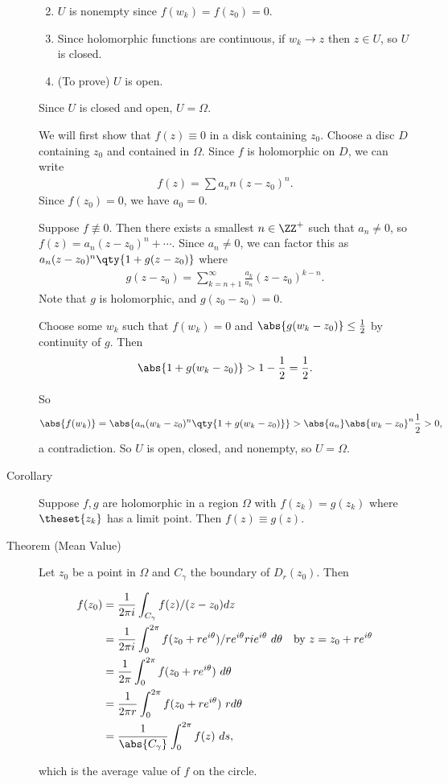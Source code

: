 \begin{description}
\begin{enumerate}
\def\labelenumi{\arabic{enumi}.}
\tightlist
\item
  \(U\) is nonempty since \(f(w_k) = f(z_0) = 0\).
\item
  Since holomorphic functions are continuous, if \(w_k \to z\) then
  \(z\in U\), so \(U\) is closed.
\item
  (To prove) \(U\) is open.
\end{enumerate}

Since \(U\) is closed and open, \(U = \Omega\).

We will first show that \(f(z) \equiv 0\) in a disk containing \(z_0\).
Choose a disc \(D\) containing \(z_0\) and contained in \(\Omega\).
Since \(f\) is holomorphic on \(D\), we can write
\begin{align*}f(z) = \sum a_nn (z-z_0)^n.\end{align*} Since
\(f(z_0) = 0\), we have \(a_0 = 0\).

Suppose \(f\not\equiv 0\). Then there exists a smallest \(n\in \ZZ^+\)
such that \(a_n \neq 0\), so \(f(z) = a_n(z-z_0)^n + \cdots\). Since
\(a_n \neq 0\), we can factor this as
\(a_n(z-z_0)^n \qty{ 1 + g(z-z_0) }\) where
\begin{align*}g(z-z_0) = \sum_{k=n+1}^\infty \frac{a_k}{a_n} (z-z_0)^{k-n}.\end{align*}
Note that \(g\) is holomorphic, and \(g(z_0 - z_0) = 0\).

Choose some \(w_k\) such that \(f(w_k) = 0\) and
\(\abs{g(w_k - z_0)} \leq \frac 1 2\) by continuity of \(g\). Then
\begin{align*}\abs{1 + g(w_k - z_0)} > 1 - \frac 1 2 = \frac 1 2.\end{align*}

So
\begin{align*}\abs{f(w_k)} = \abs{ a_n(w_k - z_0)^n \qty{1 + g(w_k - z_0)  }  } > \abs{a_n} \abs{w_k - z_0}^n \frac 1 2 > 0,\end{align*}
a contradiction. So \(U\) is open, closed, and nonempty, so
\(U = \Omega\).
\item[Corollary]
Suppose \(f, g\) are holomorphic in a region \(\Omega\) with
\(f(z_k) = g(z_k)\) where \(\theset{z_k}\) has a limit point. Then
\(f(z) \equiv g(z)\).
\item[Theorem (Mean Value)]
Let \(z_0\) be a point in \(\Omega\) and \(C_\gamma\) the boundary of
\(D_r(z_0)\). Then

\begin{align*}
f(z_0)
&= \frac{1}{2\pi i} \int_{C_\gamma} f(z)/(z-z_0) dz \\
&= \frac {1}{2\pi i} \int_0^{2\pi} f(z_0 + re^{i\theta})/re^{i\theta} r i e^{i\theta} ~d\theta \quad\text{by } z = z_0 + re^{i\theta} \\
&= \frac{1}{2\pi} \int_0^{2\pi} f(z_0 + re^{i\theta})~d\theta \\
&= \frac{1}{2\pi r} \int_0^{2\pi} f(z_0 + re^{i\theta})~rd\theta \\
&= \frac{1}{\abs{C_\gamma}} \int_0^{2\pi} f(z) ~ds
,\end{align*}

which is the average value of \(f\) on the circle.
\end{description}


